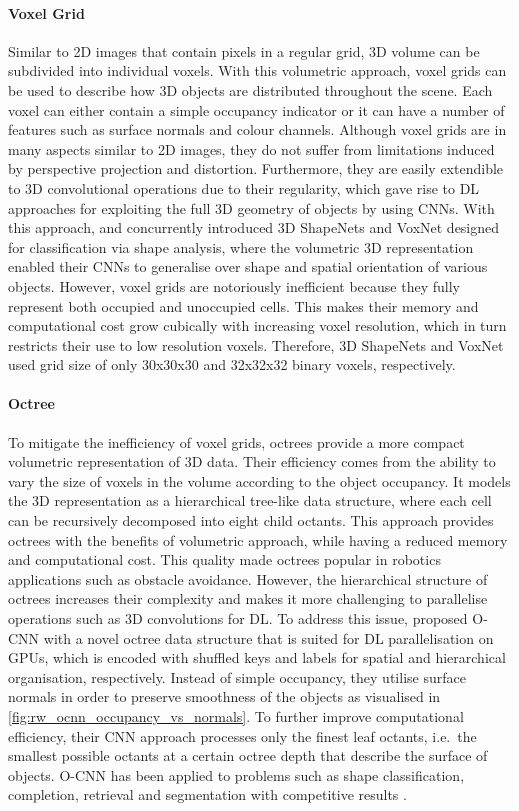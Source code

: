 \paragraph{Voxel Grid} Similar to 2D images that contain pixels in a regular grid, 3D volume can be subdivided into individual voxels. With this volumetric approach, voxel grids can be used to describe how 3D objects are distributed throughout the scene. Each voxel can either contain a simple occupancy indicator or it can have a number of features such as surface normals and colour channels. Although voxel grids are in many aspects similar to 2D images, they do not suffer from limitations induced by perspective projection and distortion. Furthermore, they are easily extendible to 3D convolutional operations due to their regularity, which gave rise to DL approaches for exploiting the full 3D geometry of objects by using CNNs. With this approach, \citet{wu_3d_2015} and \citet{maturana_voxnet_2015} concurrently introduced 3D ShapeNets and VoxNet designed for classification via shape analysis, where the volumetric 3D representation enabled their CNNs to generalise over shape and spatial orientation of various objects. However, voxel grids are notoriously inefficient because they fully represent both occupied and unoccupied cells. This makes their memory and computational cost grow cubically with increasing voxel resolution, which in turn restricts their use to low resolution voxels. Therefore, 3D ShapeNets and VoxNet used grid size of only 30x30x30 and 32x32x32 binary voxels, respectively.


\paragraph{Octree} To mitigate the inefficiency of voxel grids, octrees provide a more compact volumetric representation of 3D data. Their efficiency comes from the ability to vary the size of voxels in the volume according to the object occupancy. It models the 3D representation as a hierarchical tree-like data structure, where each cell can be recursively decomposed into eight child octants. This approach provides octrees with the benefits of volumetric approach, while having a reduced memory and computational cost. This quality made octrees popular in robotics applications such as obstacle avoidance. However, the hierarchical structure of octrees increases their complexity and makes it more challenging to parallelise operations such as 3D convolutions for DL. To address this issue, \citet{wang_o-cnn_2017} proposed O-CNN with a novel octree data structure that is suited for DL parallelisation on GPUs, which is encoded with shuffled keys and labels for spatial and hierarchical organisation, respectively. Instead of simple occupancy, they utilise surface normals in order to preserve smoothness of the objects as visualised in \autoref{fig:rw_ocnn_occupancy_vs_normals}. To further improve computational efficiency, their CNN approach processes only the finest leaf octants, i.e.~the smallest possible octants at a certain octree depth that describe the surface of objects. O-CNN has been applied to problems such as shape classification, completion, retrieval and segmentation with competitive results \cite{wang_o-cnn_2017, wang_deep_2020}.

